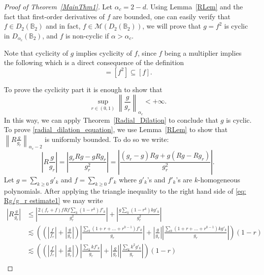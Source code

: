 \documentclass[a4paper,12pt]{amsart}
\theoremstyle{definition}
\theoremstyle{remark}
\def\B{\mathbb{B}}
\begin{document}
\begin{proof} [Proof of Theorem~\ref{MainThm1}]
    Let $\alpha_c = 2-d$. Using Lemma~\ref{RLem} and the fact that first-order derivatives of $f$ are bounded, one can easily verify that $f \in D_2(\B_2)$ and in fact, $f \in \mathcal{M}(D_2 (\B_2))$, we will prove that $g = f^2$ is cyclic in $D_{\alpha_c}(\B_2)$, and $f$ is non-cyclic if $\alpha > \alpha_c$.

    Note that cyclicity of $g$ implies cyclicity of $f$, since $f$ being a multiplier implies the following which is a direct consequence of the definition
    \begin{equation*}
        [g] = [f^2] \subseteq [f].
    \end{equation*}

    To prove the cyclicity part it is enough to show that
    \begin{equation} \label{radial_dilation_equation}
        \sup_{r \in (0,1)} \left\| \frac{g}{g_r} \right\|_{\alpha_c} < +\infty.
    \end{equation}
    In this way, we can apply Theorem~\ref{Radial_Dilation} to conclude that $g$ is cyclic.  
    To prove \eqref{radial_dilation_equation}, we use Lemma~\ref{RLem} to show that $\left\| R \frac{g}{g_r} \right\|_{\alpha_c - 2}$ is uniformly bounded.  
    To do so we write:
    \begin{equation} \label{eq: Rg/g_r estimate1}
        \left| R \frac{g}{g_r} \right| = \left|  \frac{g_rRg - g Rg_r}{g^2_r} \right| = \left|  \frac{(g_r - g) Rg + g (Rg - Rg_r)}{g^2_r} \right|.
    \end{equation}
    Let $g = \sum_{k \geq 0} g'_k$ and $f = \sum_{k \geq 0} f'_k$ where $g'_k$'s and $f'_k$'s are $k$-homogeneous polynomials. After applying the triangle inequality to the right hand side of \eqref{eq: Rg/g_r estimate1} we may write
    \begin{equation} \label{eq: Rg/g_r estimate2}
    \begin{aligned}
        \left| R \frac{g}{g_r} \right| &\leq  \left|  \frac{2(f_r+f) f Rf \sum_k(1-r^k)  f'_k}{g^2_r} \right| + \left|  \frac{ g \sum_k(1-r^k) k g'_k}{g^2_r} \right| \\
        &\lesssim \left(\left(\left|\frac{f}{f_r}\right| + \left|\frac{g}{g_r}\right| \right) \left|  \frac{ \sum_k(1+r+\ldots+r^{k-1})  f'_k}{g_r} \right| + \left|\frac{g}{g_r}\right|  \left|  \frac{ \sum_k(1+r+\ldots+r^{k-1}) k g'_k}{g_r} \right| \right) (1-r) \\
        &\lesssim \left(\left(\left|\frac{f}{f_r}\right| + \left|\frac{g}{g_r}\right| \right) \left|  \frac{ \sum_k k f'_k}{g_r} \right| + \left|\frac{g}{g_r}\right|  \left|  \frac{ \sum_k k^2 g'_k}{g_r} \right| \right) (1-r) \\

\end{aligned}
\end{equation}
\end{proof}
\end{document}
